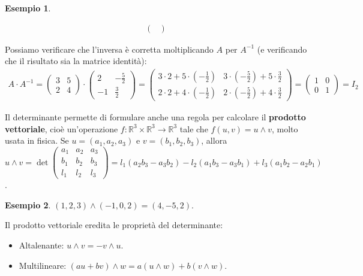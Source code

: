 \documentclass[a4paper]{article}
\theoremstyle{definition}
\newtheorem*{es}{Esempio}
\begin{document}
\begin{es}
\begin{enumerate}
\begin{align*}
\begin{pmatrix}
			                                                                                          \end{pmatrix}
		      \end{align*}
	\end{enumerate}
	Possiamo verificare che l'inversa è corretta moltiplicando $A$ per $A^{-1}$ (e verificando che il risultato sia la matrice identità):
	\begin{align*}
		A \cdot A^{-1} = \begin{pmatrix}
			                 3 & 5 \\
			                 2 & 4
		                 \end{pmatrix} \cdot \begin{pmatrix}
			                                     2  & -\frac{5}{2} \\
			                                     -1 & \frac{3}{2}
		                                     \end{pmatrix} = \begin{pmatrix}
			                                                     3 \cdot 2 + 5 \cdot ( - \frac{1}{2}) & 3 \cdot ( - \frac{5}{2}) + 5 \cdot \frac{3}{2} \\
			                                                     2 \cdot 2 + 4 \cdot ( - \frac{1}{2}) & 2 \cdot ( - \frac{5}{2}) + 4 \cdot \frac{3}{2}
		                                                     \end{pmatrix} = \begin{pmatrix}
			                                                                     1 & 0 \\
			                                                                     0 & 1
		                                                                     \end{pmatrix} = I_2
	\end{align*}
\end{es}
Il determinante permette di formulare anche una regola per calcolare il \textbf{prodotto vettoriale},
cioè un'operazione $f: \mathbb{R}^3 \times \mathbb{R}^3 \rightarrow \mathbb{R}^3$ tale che $f(u, v) = u \wedge v$, molto usata in fisica.
Se $u = (a_1, a_2, a_3)$ e $v = (b_1, b_2, b_3)$, allora $u \wedge v = \det \begin{pmatrix}
		a_1 & a_2 & a_3 \\
		b_1 & b_2 & b_3 \\
		l_1 & l_2 & l_3
	\end{pmatrix} = l_1(a_2b_3 - a_3b_2) - l_2(a_1b_3 - a_3b_1) + l_3(a_1b_2 - a_2b_1)$.
\begin{es}
	$(1, 2, 3) \wedge (-1, 0, 2) = (4, -5, 2)$.
\end{es}
Il prodotto vettoriale eredita le proprietà del determinante:
\begin{itemize}
	\item Altalenante: $u \wedge v = - v \wedge u$.
	\item Multilineare: $(au + bv) \wedge w = a(u \wedge w) + b(v \wedge w)$.
\end{itemize}
\end{document}

